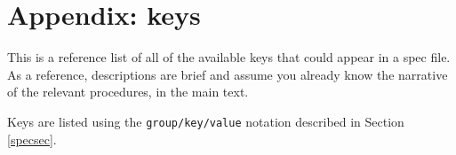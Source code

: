 \documentclass{article}
\begin{document}
\section*{Appendix: keys}

This is a reference list of all of the available keys that could appear in a spec file.
As a reference, descriptions are brief and assume you already know the narrative of the
relevant procedures, in the main text.

Keys are listed using the {\tt group/key/value} notation described in Section \ref{specsec}.



%
%
%
\end{document}
